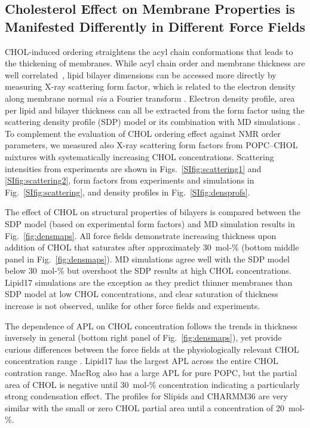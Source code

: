 \documentclass[journal=jctcce]{achemso}
\begin{document}
\subsection{Cholesterol Effect on Membrane Properties is Manifested Differently in Different Force Fields}

CHOL-induced ordering straightens the acyl chain conformations that leads to the thickening of membranes. While acyl chain order and membrane thickness are well correlated~\cite{NMRlipidsDatabank}, lipid bilayer dimensions can be accessed more directly by measuring X-ray scattering form factor, which is related to the electron density along membrane normal \textit{via} a Fourier transform \cite{pan12,Heftberger15,Marquardt15,ollila16}. Electron density profile, area per lipid and bilayer thickness can all be extracted from the form factor using the scattering density profile (SDP) model or its combination with MD simulations  \cite{Kucerka08a,pan12,Heftberger15,Marquardt15,doktorova2020molecular}. To complement the evaluation of CHOL ordering effect against NMR order parameters, we measured also X-ray scattering form factors from POPC--CHOL mixtures with systematically increasing CHOL concentrations. Scattering intensities from experiments are shown in Figs.~\ref{SIfig:scattering1} and \ref{SIfig:scattering2}, form factors from experiments and simulations in Fig.~\ref{SIfig:scattering}, and density profiles in Fig.~\ref{SIfig:densprofs}.


The effect of CHOL on structural properties of bilayers is compared between the SDP model (based on experimental form factors) and MD simulation results in Fig.~\ref{fig:densmaps}.  All force fields demonstrate increasing thickness upon addition of CHOL that saturates after approximately 30~mol-\% (bottom middle panel in Fig.~\ref{fig:densmaps}). MD simulations agree well with the SDP model below 30~mol-\% but overshoot the SDP results at high CHOL concentrations. Lipid17 simulations are the exception as they predict thinner membranes than SDP model at low CHOL concentrations, and clear saturation of thickness increase is not observed, unlike for other force fields and experiments.

The dependence of APL on CHOL concentration follows the trends in thickness inversely in general (bottom right panel of Fig.~\ref{fig:densmaps}), yet provide curious differences between the force fields at the physiologically relevant CHOL concentration range \cite{van2008membrane}. Lipid17 has the largest APL across the entire CHOL contration range. MacRog also has a large APL for pure POPC, but the partial area of CHOL is negative until 30~mol-\% concentration indicating a particularly strong condensation effect. The profiles for Slipids and CHARMM36 are very similar with the small or zero CHOL partial area until a concentration of 20~mol-\%. 
\end{document}
